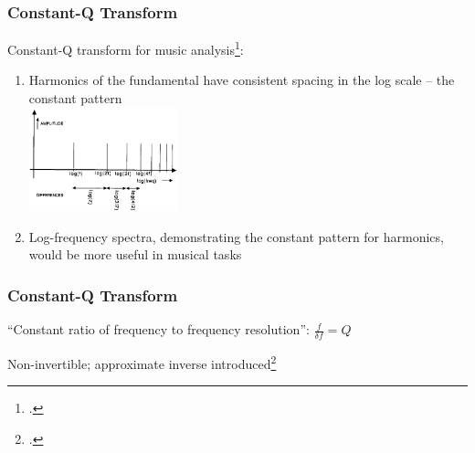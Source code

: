 \documentclass[usenames,dvipsnames]{beamer}
\begin{document}
\begin{frame}
	\frametitle{Constant-Q Transform}
	Constant-Q transform for music analysis\footcite{jbrown, msp}:
		\begin{enumerate}
			\item
				Harmonics of the fundamental have consistent spacing in the log scale -- the constant pattern\\
				\includegraphics[height=3cm]{./images-mila-presentation/logharmonic.png}
			\item
				Log-frequency spectra, demonstrating the constant pattern for harmonics, would be more useful in musical tasks
		\end{enumerate}
\end{frame}

\begin{frame}
	\frametitle{Constant-Q Transform}
	``Constant ratio of frequency to frequency resolution'': $\frac{f}{\delta f} = Q$
	\begin{figure}
		\setcounter{subfigure}{0}
		\vspace{-1em}
		\centering
	\end{figure}
	Non-invertible; approximate inverse introduced\footcite{klapuricqt}
\end{frame}
\end{document}
